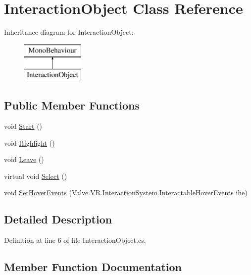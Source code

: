 \hypertarget{class_interaction_object}{}\section{Interaction\+Object Class Reference}
\label{class_interaction_object}
Inheritance diagram for Interaction\+Object\+:\begin{figure}[H]
\begin{center}
\leavevmode
\includegraphics[height=2.000000cm]{class_interaction_object}
\end{center}
\end{figure}
\subsection*{Public Member Functions}
\begin{DoxyCompactItemize}
\item 
void \mbox{\hyperlink{class_interaction_object_a7c7fcc433d4f42a854e8f73a8811bb61}{Start}} ()
\item 
void \mbox{\hyperlink{class_interaction_object_a383df284eee8296858b858b93f6520ee}{Highlight}} ()
\item 
void \mbox{\hyperlink{class_interaction_object_aea9d2f164a5fb7a5494e441b61c37eca}{Leave}} ()
\item 
virtual void \mbox{\hyperlink{class_interaction_object_a7db5da832121349c0d9133edb8d15f1a}{Select}} ()
\item 
void \mbox{\hyperlink{class_interaction_object_a0ad947302ed8ed51e72b0bd400e13ecf}{Set\+Hover\+Events}} (Valve.\+V\+R.\+Interaction\+System.\+Interactable\+Hover\+Events ihe)
\end{DoxyCompactItemize}


\subsection{Detailed Description}


Definition at line 6 of file Interaction\+Object.\+cs.



\subsection{Member Function Documentation}
\mbox{\label{class_interaction_object_a383df284eee8296858b858b93f6520ee}} 
